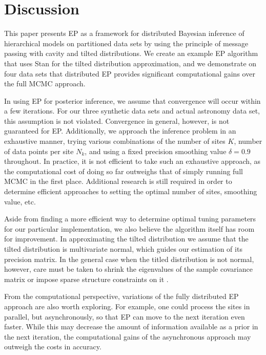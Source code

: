 \section{Discussion}
\label{sec:ep_discussion}

This paper presents EP as a framework for distributed Bayesian inference of hierarchical models on partitioned data sets by using the principle of message passing with cavity and tilted distributions. We create an example EP algorithm that uses Stan \citep{Stan:2016} for the tilted distribution approximation, and we demonstrate on four data sets that distributed EP provides significant computational gains over the full MCMC approach.

In using EP for posterior inference, we assume that convergence will occur within a few iterations. For our three synthetic data sets and actual astronomy data set, this assumption is not violated. Convergence in general, however, is not guaranteed for EP. Additionally, we approach the inference problem in an exhaustive manner, trying various combinations of the number of sites $K$, number of data points per site $N_k$, and using a fixed precision smoothing value $\delta = 0.9$ throughout. In practice, it is not efficient to take such an exhaustive approach, as the computational cost of doing so far outweighs that of simply running full MCMC in the first place. Additional research is still required in order to determine efficient approaches to setting the optimal number of sites, smoothing value, etc.

Aside from finding a more efficient way to determine optimal tuning parameters for our particular implementation, we also believe the algorithm itself has room for improvement. In approximating the tilted distribution we assume that the tilted distribution is multivariate normal, which guides our estimation of its precision matrix. In the general case when the titled distribution is not normal, however, care must be taken to shrink the eigenvalues of the sample covariance matrix or impose sparse structure constraints on it \citep{Bodnar+others:2014,Friedman+others:2008}.

From the computational perspective, variations of the fully distributed EP approach are also worth exploring. For example, one could process the sites in parallel, but asynchronously, so that EP can move to the next iteration even faster. While this may decrease the amount of information available as a prior in the next iteration, the computational gains of the asynchronous approach may outweigh the costs in accuracy.
